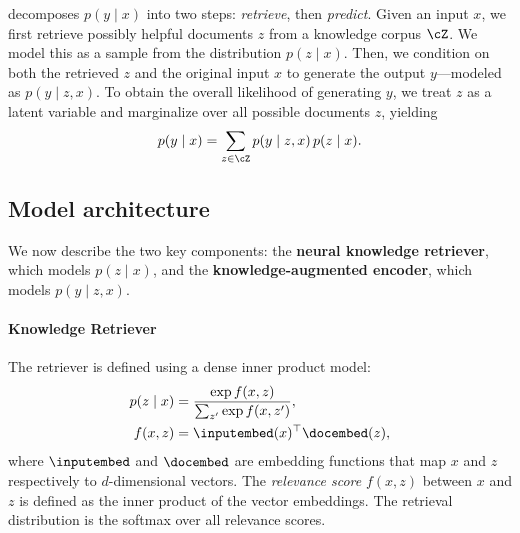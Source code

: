 \thename decomposes $p(y\mid x)$ into two steps: {\em retrieve}, then {\em predict}. Given an input $x$, we first retrieve possibly helpful documents $z$ from a knowledge corpus $\cZ$. We model this as a sample from the distribution $p(z\mid x)$. Then, we condition on both the retrieved $z$ and the original input $x$ to generate the output $y$---modeled as $p(y\mid z,x)$. To obtain the overall likelihood of generating $y$, we treat $z$ as a latent variable and marginalize over all possible documents $z$, yielding %
\begin{equation}
p(y \mid x) = \sum_{z \in \cZ} p(y \mid z, x)\, p(z \mid x). \label{eqn:marginal}
\end{equation}

\subsection{Model architecture}
\label{sec:model_architecture}
We now describe the two key components: %
the \textbf{neural knowledge retriever}, which models $p(z\mid x)$, and the \textbf{knowledge-augmented encoder}, which models $p(y\mid z,x)$.

\paragraph{Knowledge Retriever}
The retriever is defined using a dense inner product model:
\begin{align*}
p(z \mid x) &= \frac{\exp{f(x, z)}}{\sum_{z'} \exp{f(x,z')}}, \\
f(x, z) &= \inputembed(x)^\top \docembed(z),
\end{align*}
where $\inputembed$ and $\docembed$ are embedding
functions that map $x$ and $z$ respectively to $d$-dimensional vectors.
The \emph{relevance score} $f(x, z)$ between $x$ and $z$ is defined as the inner product of the vector embeddings.
The retrieval distribution is the softmax over all relevance scores.

